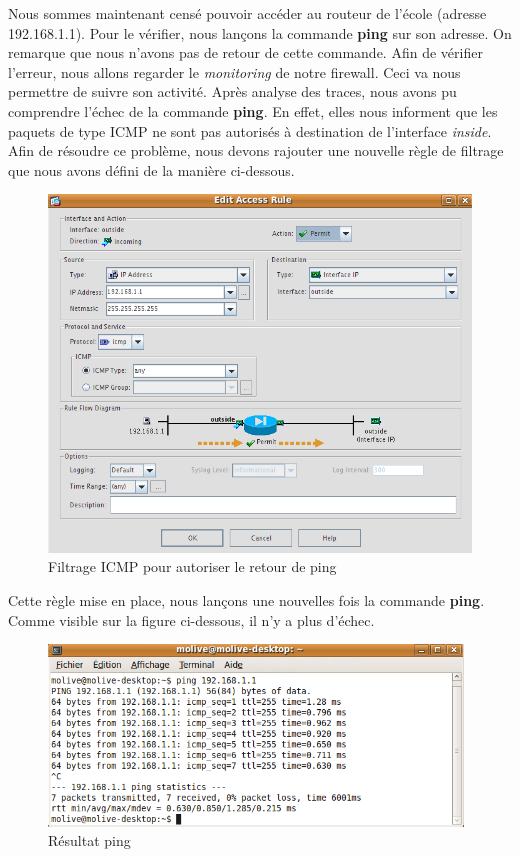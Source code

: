 \documentclass[a4paper,12pt]{article}
\begin{document}
Nous sommes maintenant censé pouvoir accéder au routeur de l'école (adresse 192.168.1.1). Pour le vérifier, nous lançons la commande \textbf{ping} sur son adresse. On remarque que nous n'avons pas de retour de cette commande. Afin de vérifier l'erreur, nous allons regarder le \textit{monitoring} de notre firewall. Ceci va nous permettre de suivre son activité. Après analyse des traces, nous avons pu comprendre l'échec de la commande \textbf{ping}. En effet, elles nous informent que les paquets de type ICMP ne sont pas autorisés à destination de l'interface \textit{inside}. Afin de résoudre ce problème, nous devons rajouter une nouvelle règle de filtrage que nous avons défini de la manière ci-dessous.
\begin{figure}[H]
	\center
	\includegraphics[width=12cm]{img/9-Pingrevientpasflitrageicmp.png}
	\caption{Filtrage ICMP pour autoriser le retour de ping}
\end{figure}

Cette règle mise en place, nous lançons une nouvelles fois la commande \textbf{ping}. Comme visible sur la figure ci-dessous, il n'y a plus d'échec.
\begin{figure}[H]
	\center
	\includegraphics[width=11cm]{img/10-pingok.png}
	\caption{Résultat ping}
\end{figure}
\end{document}
